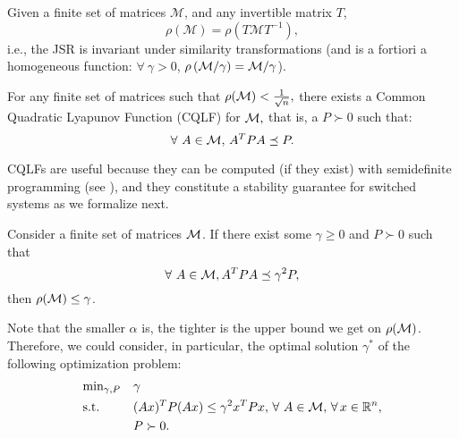 \begin{property}\label{rem:scaling}
Given a finite set of matrices $\mathcal{M}$, and any invertible matrix $T$, 
$$\rho(\mathcal{M})=\rho(T \mathcal{M} T^{-1}),$$
i.e., the JSR is invariant under similarity transformations (and is a fortiori a homogeneous function: $\forall\  \gamma > 0$, $\rho \left(\mathcal{M}/\gamma \right) = \mathcal{M}/\gamma$).
\end{property}



\begin{theorem}\cite[Theorem 2.11]{jungers_lncis}\label{thm:john}
For any finite set of matrices such that $\rho(\mathcal{M})<\frac{1}{\sqrt{n}},$ there exists a Common Quadratic Lyapunov Function (CQLF) for $\mathcal{M},$ that is, a $P\succ 0$ such that: $$\forall\ A\in \mathcal{M},\, A^TPA\preceq P. $$
\end{theorem}

CQLFs are useful because they can be computed (if they exist) with semidefinite programming (see \cite{boyd}), and they constitute a stability guarantee for switched systems as we formalize next.

\begin{theorem}\cite[Prop. 2.8]{jungers_lncis}\label{thm:cqlf} Consider a finite set of matrices $\mathcal{M}$. If there exist some $\gamma \geq 0$ and $P \succ 0$ such that $$\forall\ A \in \mathcal{M}, A^TPA \preceq \gamma^2P,$$ then $\rho(\mathcal{M}) \leq \gamma$.
\end{theorem}

Note that the smaller $\alpha$ is, the tighter is the upper bound we get on $\rho(\mathcal{M})$. Therefore, we could consider, in particular, the optimal solution $\gamma^*$ of the following optimization problem:
\begin{equation}\label{eqn:campiOpt0}
\begin{aligned}
& \text{min}_{\gamma, P} & & \gamma\\
& \text{s.t.} 
&  & (Ax)^TP(Ax) \leq \gamma^2 x^TPx,\,\forall\ A \in \mathcal{M}, \,\forall\, x \in \mathbb{R}^n,\\
& && P \succ 0. \\
\end{aligned}
\end{equation}

